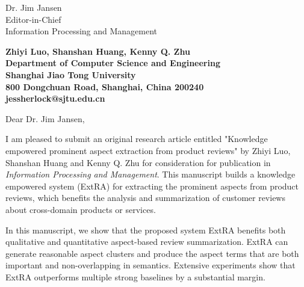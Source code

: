 \documentclass[11pt]{letter} %
\begin{document}

\begin{letter}{Dr. Jim Jansen \\
Editor-in-Chief  \\
Information Processing and Management} 


\begin{center}
\large\bf Zhiyi Luo, Shanshan Huang, Kenny Q. Zhu \\ %
Department of Computer Science and Engineering \\ Shanghai Jiao Tong University \\ 800 Dongchuan Road, Shanghai, China 200240 \\
jessherlock@sjtu.edu.cn
\end{center} 
\vfill

\signature{Zhiyi Luo} %


\opening{Dear Dr. Jim Jansen,} 

I am pleased to submit an original research article entitled 
"Knowledge empowered prominent aspect extraction from product reviews" by Zhiyi Luo, Shanshan Huang and Kenny Q. Zhu for consideration for publication in \textit{Information Processing and Management}. This manuscript builds a knowledge empowered system (ExtRA) for extracting the prominent aspects from product reviews, which benefits the analysis and summarization of customer reviews about cross-domain products or services. 

 In this manuscript, we show that the proposed system ExtRA benefits  both qualitative and quantitative aspect-based review summarization. 
 ExtRA can generate reasonable aspect clusters and produce
 the  aspect terms that are both important and non-overlapping
 in semantics. 
 Extensive experiments show that ExtRA outperforms
 multiple strong baselines by a substantial margin.
 

\end{letter}
\end{document}
